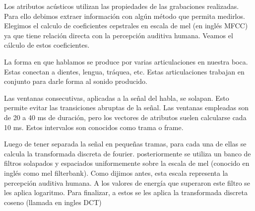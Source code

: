 Los atributos acústicos utilizan las propiedades de las grabaciones realizadas. Para ello debimos extraer información con algún método que permita medirlos. Elegimos el calculo de coeficientes cepstrales en escala de mel (en inglés MFCC) ya que tiene relación directa con la percepción auditiva humana. Veamos el cálculo de estos coeficientes.

La forma en que hablamos se produce por varias articulaciones en nuestra boca. Estas conectan a dientes, lengua, tráquea, etc. Estas articulaciones trabajan en conjunto para darle forma al sonido producido. 



Las ventanas consecutivas, aplicadas a la señal del habla, se solapan. Esto permite evitar las transiciones abruptas de la señal. Las ventanas empleadas son de 20 a 40 ms de duración, pero los vectores de atributos suelen calcularse cada 10 ms. Estos intervalos son conocidos como trama o frame.

Luego de tener separada la señal en pequeñas tramas, para cada una de ellas se calcula la transformada discreta de fourier. posteriormente se utiliza un banco de filtros solapados y espaciados uniformemente sobre la escala de mel (conocido en inglés como mel filterbank). Como dijimos antes, esta escala representa la percepción auditiva humana. A los valores de energía que superaron este filtro se les aplica logaritmo. Para finalizar, a estos se les aplica la transformada discreta coseno (llamada en ingles DCT)

